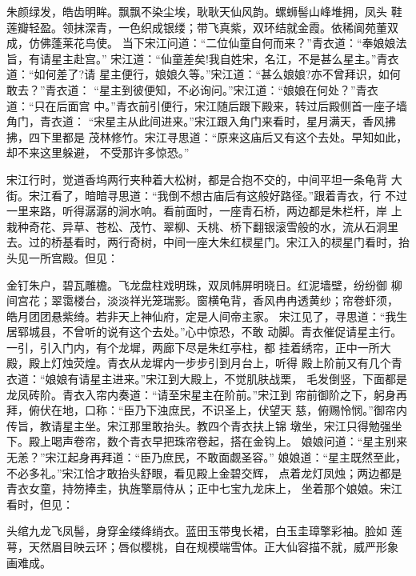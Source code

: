 朱颜绿发，皓齿明眸。飘飘不染尘埃，耿耿天仙风韵。螺蛳髻山峰堆拥，凤头
鞋莲瓣轻盈。领抹深青，一色织成银缕；带飞真紫，双环结就金霞。依稀阆苑董双
成，仿佛蓬莱花鸟使。
当下宋江问道：“二位仙童自何而来？”青衣道：“奉娘娘法旨，有请星主赴宫。”
宋江道：“仙童差矣!我自姓宋，名江，不是甚么星主。”青衣道：“如何差了?请
星主便行，娘娘久等。”宋江道：“甚么娘娘?亦不曾拜识，如何敢去？”青衣道：
“星主到彼便知，不必询问。”宋江道：“娘娘在何处？”青衣道：“只在后面宫
中。”青衣前引便行，宋江随后跟下殿来，转过后殿侧首一座子墙角门，青衣道：
“宋星主从此间进来。”宋江跟入角门来看时，星月满天，香风拂拂，四下里都是
茂林修竹。宋江寻思道：“原来这庙后又有这个去处。早知如此，却不来这里躲避，
不受那许多惊恐。”

宋江行时，觉道香坞两行夹种着大松树，都是合抱不交的，中间平坦一条龟背
大街。宋江看了，暗暗寻思道：“我倒不想古庙后有这般好路径。”跟着青衣，行
不过一里来路，听得潺潺的涧水响。看前面时，一座青石桥，两边都是朱栏杆，岸
上栽种奇花、异草、苍松、茂竹、翠柳、夭桃、桥下翻银滚雪般的水，流从石洞里
去。过的桥基看时，两行奇树，中间一座大朱红棂星门。宋江入的棂星门看时，抬
头见一所宫殿。但见：

金钉朱户，碧瓦雕檐。飞龙盘柱戏明珠，双凤帏屏明晓日。红泥墙壁，纷纷御
柳间宫花；翠霭楼台，淡淡祥光笼瑞影。窗横龟背，香风冉冉透黄纱；帘卷虾须，
皓月团团悬紫绮。若非天上神仙府，定是人间帝主家。
宋江见了，寻思道：“我生居郓城县，不曾听的说有这个去处。”心中惊恐，不敢
动脚。青衣催促请星主行。一引，引入门内，有个龙墀，两廊下尽是朱红亭柱，都
挂着绣帘，正中一所大殿，殿上灯烛荧煌。青衣从龙墀内一步步引到月台上，听得
殿上阶前又有几个青衣道：“娘娘有请星主进来。”宋江到大殿上，不觉肌肤战栗，
毛发倒竖，下面都是龙凤砖阶。青衣入帘内奏道：“请至宋星主在阶前。”宋江到
帘前御阶之下，躬身再拜，俯伏在地，口称：“臣乃下浊庶民，不识圣上，伏望天
慈，俯赐怜悯。”御帘内传旨，教请星主坐。宋江那里敢抬头。教四个青衣扶上锦
墩坐，宋江只得勉强坐下。殿上喝声卷帘，数个青衣早把珠帘卷起，搭在金钩上。
娘娘问道：“星主别来无恙？”宋江起身再拜道：“臣乃庶民，不敢面觑圣容。”
娘娘道：“星主既然至此，不必多礼。”宋江恰才敢抬头舒眼，看见殿上金碧交辉，
点着龙灯凤烛；两边都是青衣女童，持笏捧圭，执旌擎扇侍从；正中七宝九龙床上，
坐着那个娘娘。宋江看时，但见：

头绾九龙飞凤髻，身穿金缕绛绡衣。蓝田玉带曳长裙，白玉圭璋擎彩袖。脸如
莲萼，天然眉目映云环；唇似樱桃，自在规模端雪体。正大仙容描不就，威严形象
画难成。

